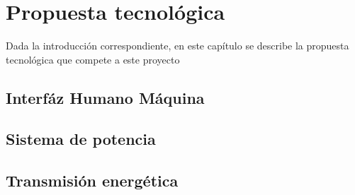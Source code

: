 
\chapter{Propuesta tecnol\'ogica} %

\label{Chapter3} %



Dada la introducci\'on correspondiente, en este cap\'itulo se describe la
propuesta tecnol\'ogica que compete a este proyecto
\section{Interf\'az Humano M\'aquina}
\section{Sistema de potencia}
\section{Transmisi\'on energ\'etica}

